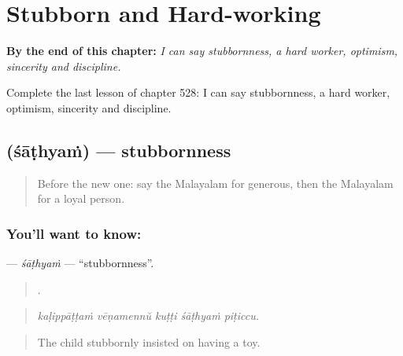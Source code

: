 
\chapter{Stubborn and Hard-working}
\label{ch:ml-stubborn-and-hard-working}

\begin{chapteropening}
\textbf{By the end of this chapter:} \emph{I can say stubbornness, a hard worker, optimism, sincerity and discipline.}

Complete the last lesson of chapter 528: I can say stubbornness, a hard worker, optimism, sincerity and discipline.
\end{chapteropening}

\section[\texorpdfstring{\ml{ശാഠ്യം} (śāṭhyaṁ)}{ശാഠ്യം (śāṭhyaṁ)}]{ (śāṭhyaṁ) — stubbornness}

\label{lesson:ML-C528-sathyam}



\begin{quote}
Before the new one: say the Malayalam for generous, then the Malayalam for a loyal person.
\end{quote}

\subsection*{You'll want to know: }
\textbf{} — \emph{śāṭhyaṁ} — \textquotedblleft{}stubbornness\textquotedblright{}.

\begin{quote}
    .
\end{quote}

\begin{quote}
\emph{kaḷippāṭṭaṁ vēṇamennŭ kuṭṭi śāṭhyaṁ piṭiccu.}
\end{quote}

\begin{quote}
The child stubbornly insisted on having a toy.
\end{quote}

